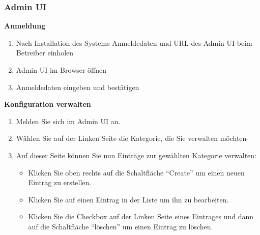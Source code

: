 \subsubsection*{Admin UI}

\textbf{Anmeldung}

\begin{enumerate}
    \item Nach Installation des Systems Anmeldedaten und URL des Admin UI beim Betreiber einholen
    \item Admin UI im Browser öffnen
    \item Anmeldedaten eingeben und bestätigen
\end{enumerate}

\textbf{Konfiguration verwalten}
\begin{enumerate}
    \item Melden Sie sich im Admin UI an.
    \item Wählen Sie auf der Linken Seite die Kategorie, die Sie verwalten möchten-
    \item Auf dieser Seite können Sie nun Einträge zur gewählten Kategorie verwalten:
    \begin{itemize}
        \item Klicken Sie oben rechts auf die Schaltfläche ``Create'' um einen neuen Eintrag zu erstellen.
        \item Klicken Sie auf einen Eintrag in der Liste um ihn zu bearbeiten.
        \item Klicken Sie die Checkbox auf der Linken Seite eines Eintrages und dann auf die Schaltfläche ``löschen'' um einen Eintrag zu löschen.
    \end{itemize}
\end{enumerate}

